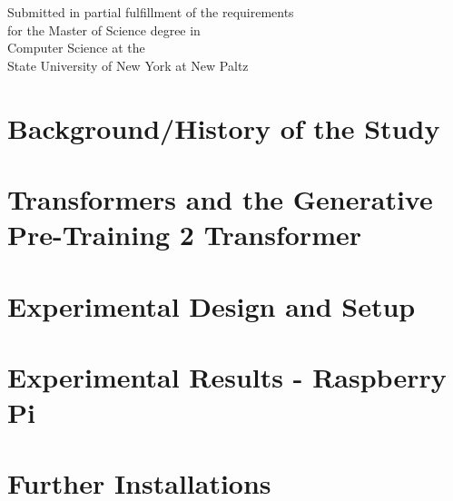 \documentclass[english]{report}
\begin{document}
\vspace{1cm}

\begin{center}
	Submitted in partial fulfillment of the requirements \\
	for the Master of Science degree in \\
	Computer Science at the \\
	State University of New York at New Paltz \\
\end{center}


\newpage



\vspace{5mm}


\newpage

\tableofcontents

\newpage

\listoffigures
\listoftables



\newpage
{}

	


\chapter{Background/History of the Study}



\chapter{Transformers and the Generative Pre-Training 2 Transformer}



\chapter{Experimental Design and Setup}



\chapter{Experimental Results - Raspberry Pi}



\chapter{Further Installations}
\end{document}
